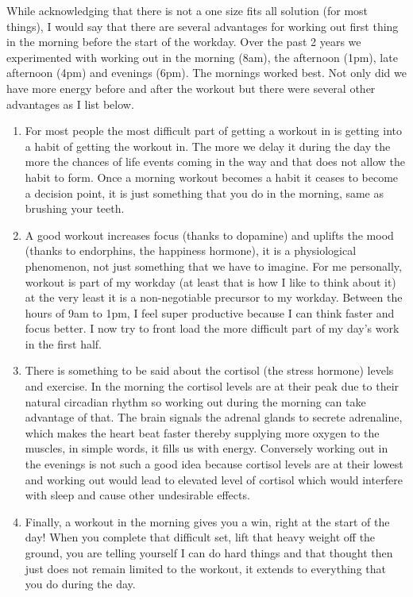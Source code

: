 \documentclass[
  oneside]{book}
\begin{document}
While acknowledging that there is not a one size fits all solution (for most things), I would say that there are several advantages for working out first thing in the morning before the start of the workday. Over the past 2 years we experimented with working out in the morning (8am), the afternoon (1pm), late afternoon (4pm) and evenings (6pm). The mornings worked best. Not only did we have more energy before and after the workout but there were several other advantages as I list below.

\begin{enumerate}
\def\labelenumi{\arabic{enumi}.}
\item
  For most people the most difficult part of getting a workout in is getting into a habit of getting the workout in. The more we delay it during the day the more the chances of life events coming in the way and that does not allow the habit to form. Once a morning workout becomes a habit it ceases to become a decision point, it is just something that you do in the morning, same as brushing your teeth.
\item
  A good workout increases focus (thanks to dopamine) and uplifts the mood (thanks to endorphins, the happiness hormone), it is a physiological phenomenon, not just something that we have to imagine. For me personally, workout is part of my workday (at least that is how I like to think about it) at the very least it is a non-negotiable precursor to my workday. Between the hours of 9am to 1pm, I feel super productive because I can think faster and focus better. I now try to front load the more difficult part of my day's work in the first half.
\item
  There is something to be said about the cortisol (the stress hormone) levels and exercise. In the morning the cortisol levels are at their peak due to their natural circadian rhythm so working out during the morning can take advantage of that. The brain signals the adrenal glands to secrete adrenaline, which makes the heart beat faster thereby supplying more oxygen to the muscles, in simple words, it fills us with energy. Conversely working out in the evenings is not such a good idea because cortisol levels are at their lowest and working out would lead to elevated level of cortisol which would interfere with sleep and cause other undesirable effects.
\item
  Finally, a workout in the morning gives you a win, right at the start of the day! When you complete that difficult set, lift that heavy weight off the ground, you are telling yourself I can do hard things and that thought then just does not remain limited to the workout, it extends to everything that you do during the day.
\end{enumerate}
\end{document}
